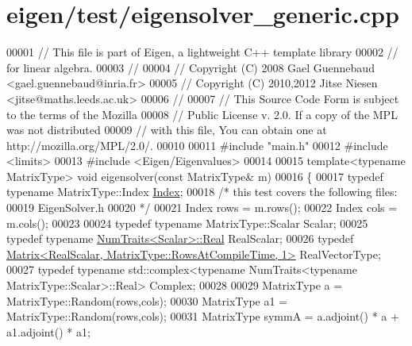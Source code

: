 \hypertarget{eigen_2test_2eigensolver__generic_8cpp_source}{}\section{eigen/test/eigensolver\+\_\+generic.cpp}
\label{eigen_2test_2eigensolver__generic_8cpp_source}

\begin{DoxyCode}
00001 \textcolor{comment}{// This file is part of Eigen, a lightweight C++ template library}
00002 \textcolor{comment}{// for linear algebra.}
00003 \textcolor{comment}{//}
00004 \textcolor{comment}{// Copyright (C) 2008 Gael Guennebaud <gael.guennebaud@inria.fr>}
00005 \textcolor{comment}{// Copyright (C) 2010,2012 Jitse Niesen <jitse@maths.leeds.ac.uk>}
00006 \textcolor{comment}{//}
00007 \textcolor{comment}{// This Source Code Form is subject to the terms of the Mozilla}
00008 \textcolor{comment}{// Public License v. 2.0. If a copy of the MPL was not distributed}
00009 \textcolor{comment}{// with this file, You can obtain one at http://mozilla.org/MPL/2.0/.}
00010 
00011 \textcolor{preprocessor}{#include "main.h"}
00012 \textcolor{preprocessor}{#include <limits>}
00013 \textcolor{preprocessor}{#include <Eigen/Eigenvalues>}
00014 
00015 \textcolor{keyword}{template}<\textcolor{keyword}{typename} MatrixType> \textcolor{keywordtype}{void} eigensolver(\textcolor{keyword}{const} MatrixType& m)
00016 \{
00017   \textcolor{keyword}{typedef} \textcolor{keyword}{typename} MatrixType::Index \hyperlink{namespace_eigen_a62e77e0933482dafde8fe197d9a2cfde}{Index};
00018   \textcolor{comment}{/* this test covers the following files:}
00019 \textcolor{comment}{     EigenSolver.h}
00020 \textcolor{comment}{  */}
00021   Index rows = m.rows();
00022   Index cols = m.cols();
00023 
00024   \textcolor{keyword}{typedef} \textcolor{keyword}{typename} MatrixType::Scalar Scalar;
00025   \textcolor{keyword}{typedef} \textcolor{keyword}{typename} \hyperlink{group___core___module_struct_eigen_1_1_num_traits}{NumTraits<Scalar>::Real} RealScalar;
00026   \textcolor{keyword}{typedef} \hyperlink{group___core___module_class_eigen_1_1_matrix}{Matrix<RealScalar, MatrixType::RowsAtCompileTime, 1>}
       RealVectorType;
00027   \textcolor{keyword}{typedef} \textcolor{keyword}{typename} std::complex<typename NumTraits<typename MatrixType::Scalar>::Real> Complex;
00028 
00029   MatrixType a = MatrixType::Random(rows,cols);
00030   MatrixType a1 = MatrixType::Random(rows,cols);
00031   MatrixType symmA =  a.adjoint() * a + a1.adjoint() * a1;

\end{DoxyCode}
